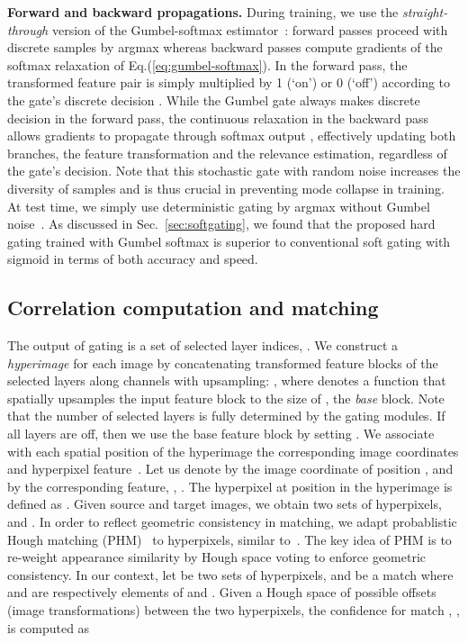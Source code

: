 \documentclass[runningheads]{llncs}
\begin{document}
\smallbreak
\noindent \textbf{Forward and backward propagations.} During training, we use the {\em straight-through} version of the Gumbel-softmax estimator~\cite{eric2017categorical}: forward passes proceed with discrete samples by argmax whereas backward passes compute gradients of the softmax relaxation of Eq.(\ref{eq:gumbel-softmax}). In the forward pass, the transformed feature pair  is simply multiplied by 1 (`on') or 0 (`off') according to the gate's discrete decision . 
While the Gumbel gate always makes discrete decision  in the forward pass, the continuous relaxation in the backward pass allows gradients to propagate through softmax output , effectively updating both branches, the feature transformation and the relevance estimation,  regardless of the gate's decision.
Note that this stochastic gate with random noise increases the diversity of samples and is thus crucial in preventing mode collapse in training. At test time, we simply use deterministic gating by argmax without Gumbel noise~\cite{eric2017categorical}.
As discussed in Sec.~\ref{sec:softgating}, we found that the proposed hard gating trained with Gumbel softmax is superior to conventional soft gating with sigmoid in terms of both accuracy and speed.

\subsection{Correlation computation and matching}
The output of gating is a set of selected layer indices, . We construct a {\em hyperimage}  for each image by concatenating transformed feature blocks of the selected layers along channels with upsampling: 
,
where  denotes a function that spatially upsamples the input feature block to the size of , the {\em base} block. Note that the number of selected layers  is fully determined by the gating modules. If all layers are off, then we use the base feature block by setting . We associate with each spatial position  of the hyperimage the corresponding image coordinates and hyperpixel feature~\cite{min2019hyperpixel}. Let us denote by  the image coordinate of position , and by   the corresponding feature, {\em \ie}, .
The hyperpixel at position  in the hyperimage is defined as
  . Given source and target images, we obtain two sets of hyperpixels,  and . 
In order to reflect geometric consistency in matching, we adapt probablistic Hough matching (PHM)~\cite{cho2015unsupervised,han2017scnet} to hyperpixels, similar to~\cite{min2019hyperpixel}. The key idea of PHM is to re-weight appearance similarity by Hough space voting to enforce geometric consistency. In our context, let  be two sets of hyperpixels, and  be a match where  and  are respectively elements of  and . Given a Hough space  of possible offsets (image transformations) between the two hyperpixels, the confidence for match , , is computed as  
 
\end{document}
